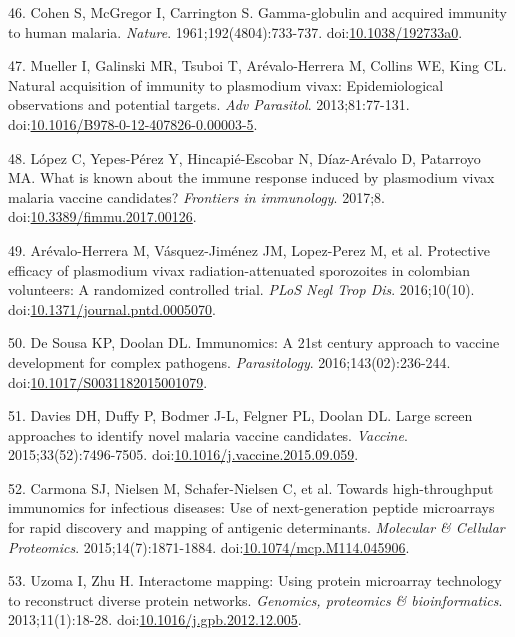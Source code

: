 \documentclass[]{article}
\begin{document}
\hypertarget{ref-cohen1961}{}
46. Cohen S, McGregor I, Carrington S. Gamma-globulin and acquired
immunity to human malaria. \emph{Nature}. 1961;192(4804):733-737.
doi:\href{https://doi.org/10.1038/192733a0}{10.1038/192733a0}.

\hypertarget{ref-mueller2013}{}
47. Mueller I, Galinski MR, Tsuboi T, Arévalo-Herrera M, Collins WE,
King CL. Natural acquisition of immunity to plasmodium vivax:
Epidemiological observations and potential targets. \emph{Adv
Parasitol}. 2013;81:77-131.
doi:\href{https://doi.org/10.1016/B978-0-12-407826-0.00003-5}{10.1016/B978-0-12-407826-0.00003-5}.

\hypertarget{ref-lopez2017}{}
48. López C, Yepes-Pérez Y, Hincapié-Escobar N, Díaz-Arévalo D,
Patarroyo MA. What is known about the immune response induced by
plasmodium vivax malaria vaccine candidates? \emph{Frontiers in
immunology}. 2017;8.
doi:\href{https://doi.org/10.3389/fimmu.2017.00126}{10.3389/fimmu.2017.00126}.

\hypertarget{ref-arevalo2016spz}{}
49. Arévalo-Herrera M, Vásquez-Jiménez JM, Lopez-Perez M, et al.
Protective efficacy of plasmodium vivax radiation-attenuated sporozoites
in colombian volunteers: A randomized controlled trial. \emph{PLoS Negl
Trop Dis}. 2016;10(10).
doi:\href{https://doi.org/10.1371/journal.pntd.0005070}{10.1371/journal.pntd.0005070}.

\hypertarget{ref-immunomics2016}{}
50. De Sousa KP, Doolan DL. Immunomics: A 21st century approach to
vaccine development for complex pathogens. \emph{Parasitology}.
2016;143(02):236-244.
doi:\href{https://doi.org/10.1017/S0031182015001079}{10.1017/S0031182015001079}.

\hypertarget{ref-Davies2015Large}{}
51. Davies DH, Duffy P, Bodmer J-L, Felgner PL, Doolan DL. Large screen
approaches to identify novel malaria vaccine candidates. \emph{Vaccine}.
2015;33(52):7496-7505.
doi:\href{https://doi.org/10.1016/j.vaccine.2015.09.059}{10.1016/j.vaccine.2015.09.059}.

\hypertarget{ref-carmona2015peptide}{}
52. Carmona SJ, Nielsen M, Schafer-Nielsen C, et al. Towards
high-throughput immunomics for infectious diseases: Use of
next-generation peptide microarrays for rapid discovery and mapping of
antigenic determinants. \emph{Molecular \& Cellular Proteomics}.
2015;14(7):1871-1884.
doi:\href{https://doi.org/10.1074/mcp.M114.045906}{10.1074/mcp.M114.045906}.

\hypertarget{ref-uzoma2013interactome}{}
53. Uzoma I, Zhu H. Interactome mapping: Using protein microarray
technology to reconstruct diverse protein networks. \emph{Genomics,
proteomics \& bioinformatics}. 2013;11(1):18-28.
doi:\href{https://doi.org/10.1016/j.gpb.2012.12.005}{10.1016/j.gpb.2012.12.005}.
\end{document}
